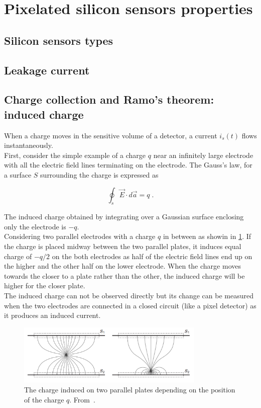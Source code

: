 \section{Pixelated silicon sensors properties}
\subsection{Silicon sensors types}
\subsection{Leakage current}
\subsection{Charge collection and Ramo's theorem: induced charge}\label{sec:RamoTheorem}
When a charge moves in the sensitive volume of a detector, a current
$i_s(t)$ flows instantaneously. \\ 
First, consider the simple example of a charge $q$ near an infinitely
large electrode with all the electric field lines terminating on the
electrode. The Gauss's law, for a surface $S$ surrounding the charge
is expressed as

\begin{equation}
\oint_{s} \vec{E} \cdot d\vec{a}=q\; .
\label{eq:GaussLaw}
\end{equation}

The induced charge obtained by integrating over a Gaussian surface
enclosing only the electrode is $-q$. \\
Considering two parallel electrodes with a charge $q$ in between as
showin in \cref{fig:InducedCharge_parallelPlates}. If the charge
is placed midway between the two parallel plates, it induces equal
charge of $-q/2$ on the both electrodes as half of the electric field
lines end up on the higher and the other half on the lower
electrode. When the charge moves towards the closer to a plate rather
than the other, the induced charge will be higher for the closer
plate. \\
The induced charge can not be observed directly but its change can be
measured when the two electrodes are connected in a closed circuit
(like a pixel detector) as it produces an induced current.

\begin{figure}[htbp]
  \centering
  \includegraphics[width=0.8\textwidth]{figures/Ramo/InducedCharge_parallelPlates.png}
  \caption{The charge induced on two parallel plates depending on the
    position of the charge $q$. From~\cite{Spieler2005}.}
  \label{fig:InducedCharge_parallelPlates}
\end{figure}

